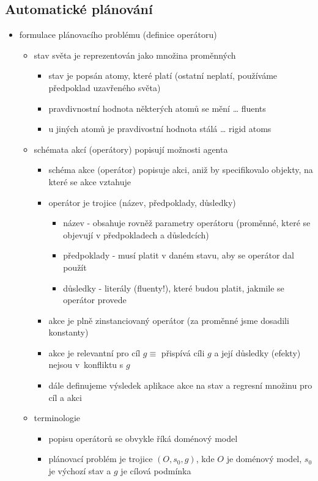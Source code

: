 \subsection{Automatické plánování}
\begin{itemize}
\item formulace plánovacího problému (definice operátoru)
\begin{itemize}
\item stav světa je reprezentován jako množina proměnných
\begin{itemize}
\item stav je popsán atomy, které platí (ostatní neplatí, používáme předpoklad uzavřeného světa)
\item pravdivnostní hodnota některých atomů se mění \dots{} fluents
\item u jiných atomů je pravdivostní hodnota stálá \dots{} rigid atoms
\end{itemize}
\item schémata akcí (operátory) popisují možnosti agenta
\begin{itemize}
\item schéma akce (operátor) popisuje akci, aniž by specifikovalo objekty, na které se akce vztahuje
\item operátor je trojice (název, předpoklady, důsledky)
\begin{itemize}
\item název - obsahuje rovněž parametry operátoru (proměnné, které se objevují v předpokladech a důsledcích)
\item předpoklady - musí platit v daném stavu, aby se operátor dal použít
\item důsledky - literály (fluenty!), které budou platit, jakmile se operátor provede
\end{itemize}
\item akce je plně zinstanciovaný operátor (za proměnné jsme dosadili konstanty)
\item akce je relevantní pro cíl $g\equiv$ přispívá cíli $g$ a její důsledky (efekty) nejsou v~konfliktu s $g$
\item dále definujeme výsledek aplikace akce na stav a regresní množinu pro cíl a akci
\end{itemize}
\item terminologie
\begin{itemize}
\item popisu operátorů se obvykle říká doménový model
\item plánovací problém je trojice $(O,s_0,g)$, kde $O$ je doménový model, $s_0$ je výchozí stav a $g$ je cílová podmínka

\end{itemize}
\end{itemize}
\end{itemize}
